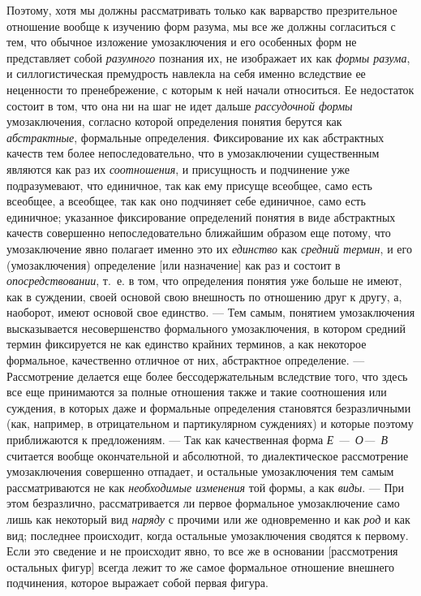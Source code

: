 \documentclass[twoside]{article}
\begin{document}
{{{{{Поэтому, хотя мы должны рассматривать только как варварство
презрительное отношение вообще к изучению форм разума, мы все же должны
согласиться с тем, что обычное изложение умозаключения и его особенных форм
не представляет собой {\em разумного}
познания их, не изображает их как
{\em формы разума}, и
силлогистическая премудрость навлекла на себя именно вследствие ее
неценности то пренебрежение, с которым к ней начали относиться. Ее
недостаток состоит в том, что она ни на шаг не идет дальше
{\em рассудочной формы}
умозаключения, согласно которой определения понятия берутся
как {\em абстрактные},
формальные определения. Фиксирование их как абстрактных
качеств тем более непоследовательно, что в умозаключении существенным
являются как раз их {\em соотношения},
и присущность и подчинение уже подразумевают, что единичное,
так как ему присуще всеобщее, само есть всеобщее, а всеобщее, так как оно
подчиняет себе единичное, само есть единичное; указанное фиксирование
определений понятия в виде абстрактных качеств совершенно непоследовательно
ближайшим образом еще потому, что умозаключение явно полагает именно это их
{\em единство} как
{\em средний термин}, и
его (умозаключения) определение [или назначение] как раз и состоит в
{\em опосредствовании},
т.~е. в том, что определения понятия уже больше не имеют, как
в суждении, своей основой свою внешность по отношению друг к другу, а,
наоборот, имеют основой свое единство. — Тем самым, понятием
умозаключения высказывается несовершенство формального умозаключения, в
котором средний термин фиксируется не как единство крайних терминов, а как
некоторое формальное, качественно отличное от них, абстрактное
определение. — Рассмотрение делается еще более
бессодержательным вследствие того, что здесь все еще принимаются за полные
отношения также и такие соотношения или суждения, в которых даже и
формальные определения становятся безразличными (как, например, в
отрицательном и партикулярном суждениях) и которые поэтому приближаются к
предложениям. — Так как качественная форма
{\em Е —~О—~В} считается вообще окончательной и
абсолютной, то диалектическое рассмотрение умозаключения совершенно
отпадает, и остальные умозаключения тем самым рассматриваются не как
{\em необходимые изменения}
той формы, а как
{\em виды}. — При этом
безразлично, рассматривается ли первое формальное умозаключение само лишь
как некоторый вид {\em наряду}
с прочими или же одновременно и как
{\em род} и как вид;
последнее происходит, когда остальные умозаключения сводятся к первому.
Если это сведение и не происходит явно, то все же в основании [рассмотрения
остальных фигур] всегда лежит то же самое формальное отношение внешнего
подчинения, которое выражает собой первая фигура.

}}}}}
\end{document}

